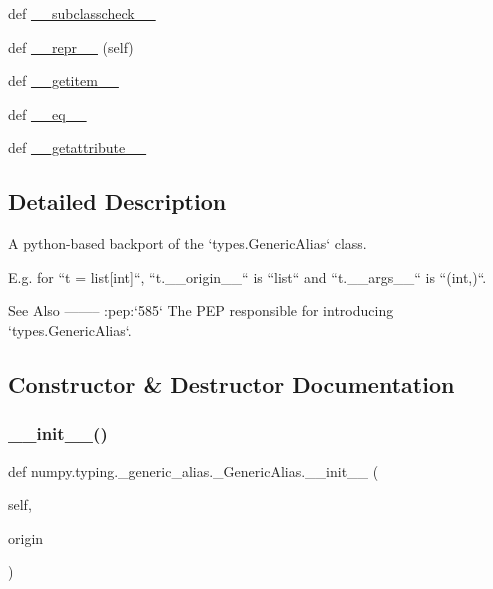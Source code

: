 \begin{DoxyCompactItemize}
\item 
def \hyperlink{classnumpy_1_1typing_1_1__generic__alias_1_1__GenericAlias_a99d1fa7e7efd3e12ffa7ba817b64de58}{\+\_\+\+\_\+subclasscheck\+\_\+\+\_\+}
\item 
def \hyperlink{classnumpy_1_1typing_1_1__generic__alias_1_1__GenericAlias_aceca5fc8faf70251468aa40b3e89e06a}{\+\_\+\+\_\+repr\+\_\+\+\_\+} (self)
\item 
def \hyperlink{classnumpy_1_1typing_1_1__generic__alias_1_1__GenericAlias_a1879039421500ffbe20a9093e439039e}{\+\_\+\+\_\+getitem\+\_\+\+\_\+}
\item 
def \hyperlink{classnumpy_1_1typing_1_1__generic__alias_1_1__GenericAlias_a7ca75f83c6f94f17c453d92a04cfa839}{\+\_\+\+\_\+eq\+\_\+\+\_\+}
\item 
def \hyperlink{classnumpy_1_1typing_1_1__generic__alias_1_1__GenericAlias_aa4ba7c947f1a3cf09b61ee0cb3e26886}{\+\_\+\+\_\+getattribute\+\_\+\+\_\+}
\end{DoxyCompactItemize}


\subsection{Detailed Description}
\begin{DoxyVerb}A python-based backport of the `types.GenericAlias` class.

E.g. for ``t = list[int]``, ``t.__origin__`` is ``list`` and
``t.__args__`` is ``(int,)``.

See Also
--------
:pep:`585`
    The PEP responsible for introducing `types.GenericAlias`.\end{DoxyVerb}
 

\subsection{Constructor \& Destructor Documentation}
\mbox{\label{classnumpy_1_1typing_1_1__generic__alias_1_1__GenericAlias_a95d0acb49cd6cfb065d89e03b01be90a}} 
\subsubsection{\texorpdfstring{\+\_\+\+\_\+init\+\_\+\+\_\+()}{\_\_init\_\_()}}
{\footnotesize\ttfamily def numpy.\+typing.\+\_\+generic\+\_\+alias.\+\_\+\+Generic\+Alias.\+\_\+\+\_\+init\+\_\+\+\_\+ (\begin{DoxyParamCaption}\item[{}]{self,  }\item[{}]{origin }\end{DoxyParamCaption})}



